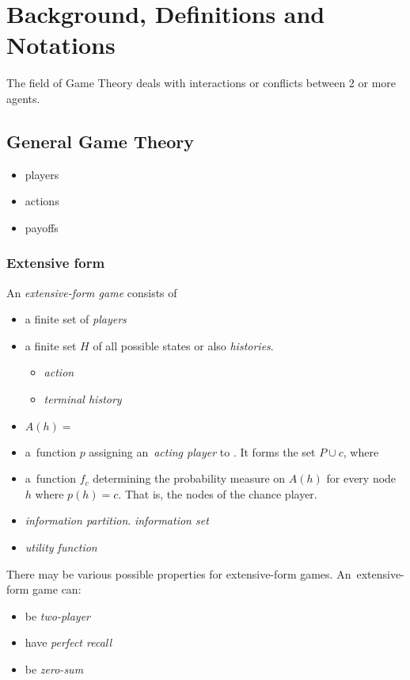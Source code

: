 \chapter{Background, Definitions and Notations}

The field of Game Theory deals with interactions or conflicts between $2$ or more agents.
\todo

\section{General Game Theory}

\begin{itemize}
  \item players
  \item actions
  \item payoffs
\end{itemize}

\subsection{Extensive form}

An \emph{extensive-form game} consists of

\begin{itemize}
  \item a finite set of \emph{players}
  \item a finite set $H$ of all possible states or also \emph{histories}.
    \begin{itemize}
      \item \emph{action}
      \item \emph{terminal history}
    \end{itemize}
  \item $A(h) = $
  \item a~function $p$ assigning an~\emph{acting player} to \todo.
    It forms the set $P \cup c$, where \todo
  \item a~function $f_c$ determining the probability measure on $A(h)$ for every node $h$ where $p(h) = c$.
    That is, the nodes of the chance player.
  \item \emph{information partition}. \emph{information set}
  \item \emph{utility function}
\end{itemize}

There may be various possible properties for extensive-form games.
An~extensive-form game can:

\begin{itemize}
  \item be \emph{two-player}
  \item have \emph{perfect recall}
  \item be \emph{zero-sum}
\end{itemize}

